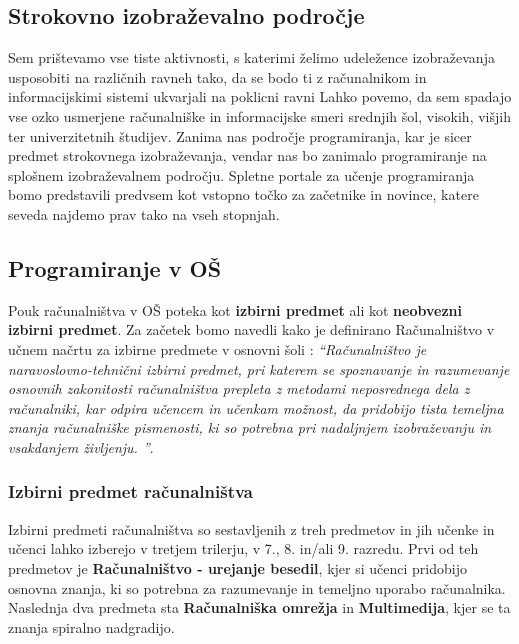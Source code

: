 \subsection{Strokovno izobraževalno področje}
\label{sec:strokovno_izo_področje}


Sem prištevamo vse tiste aktivnosti, s katerimi želimo udeležence
izobraževanja usposobiti na različnih ravneh tako, da se bodo ti z
računalnikom in informacijskimi sistemi ukvarjali na poklicni ravni
Lahko povemo, da sem spadajo vse ozko usmerjene računalniške in
informacijske smeri srednjih šol, visokih, višjih ter univerzitetnih
študijev. Zanima nas področje programiranja, kar je sicer predmet
strokovnega izobraževanja, vendar nas bo zanimalo programiranje na
splošnem izobraževalnem področju. Spletne portale za učenje
programiranja bomo predstavili predvsem kot vstopno točko za začetnike
in novince, katere seveda najdemo prav tako na vseh stopnjah. 

\subsection{Programiranje v OŠ}
\label{sec:Programiranje_v_OŠ}

Pouk računalništva v OŠ poteka kot \textbf{izbirni predmet} ali kot
\textbf{neobvezni izbirni predmet}. Za začetek bomo navedli kako je
definirano Računalništvo v učnem načrtu za izbirne predmete v osnovni
šoli \cite{ucni_nacrt-izbirni-os}: \emph{``Računalništvo je
  naravoslovno-tehnični izbirni predmet, pri katerem se spoznavanje in
  razumevanje osnovnih zakonitosti računalništva prepleta z metodami
  neposrednega dela z računalniki, kar odpira učencem in učenkam
  možnost, da pridobijo tista temeljna znanja računalniške pismenosti,
  ki so potrebna pri nadaljnjem izobraževanju in vsakdanjem življenju.
  ''}.

\subsubsection{Izbirni predmet računalništva}
\label{sec:izbirni_predmet_rac}

Izbirni predmeti računalništva so sestavljenih z treh predmetov in jih
učenke in učenci lahko izberejo v tretjem trilerju, v 7., 8. in/ali
9. razredu. Prvi od teh predmetov je \textbf{Računalništvo - urejanje
  besedil}, kjer si učenci pridobijo osnovna znanja, ki so potrebna za
razumevanje in temeljno uporabo računalnika. Naslednja dva predmeta
sta \textbf{Računalniška omrežja} in \textbf{Multimedija}, kjer se ta
znanja spiralno nadgradijo.

